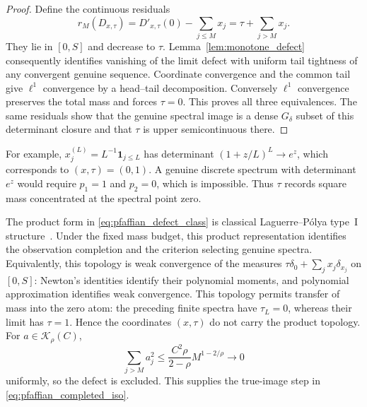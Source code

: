 \documentclass[11pt,a4paper]{amsart}
\numberwithin{equation}{section}
\theoremstyle{definition}
\theoremstyle{remark}
\begin{document}
\begin{proof}
Define the continuous residuals
\begin{equation}\label{eq:spectral_monotone_defect}
 r_M(D_{x,\tau})=D'_{x,\tau}(0)-\sum_{j\le M}x_j
               =\tau+\sum_{j>M}x_j.
\end{equation}
They lie in $[0,S]$ and decrease to $\tau$. Lemma~\ref{lem:monotone_defect} consequently identifies vanishing of the limit defect with uniform tail tightness of any convergent genuine sequence. Coordinate convergence and the common tail give $\ell^1$ convergence by a head--tail decomposition. Conversely $\ell^1$ convergence preserves the total mass and forces $\tau=0$. This proves all three equivalences. The same residuals show that the genuine spectral image is a dense $G_\delta$ subset of this determinant closure and that $\tau$ is upper semicontinuous there.
\end{proof}

For example, $x_j^{(L)}=L^{-1}\mathbf1_{j\le L}$ has determinant
$(1+z/L)^L\to e^z$, which corresponds to $(x,\tau)=(0,1)$. A genuine discrete spectrum with determinant $e^z$ would require $p_1=1$ and $p_2=0$, which is impossible. Thus $\tau$ records square mass concentrated at the spectral point zero.

The product form in \eqref{eq:pfaffian_defect_class} is classical Laguerre--P\'olya type~I structure~\cite{NguyenVishnyakova}. Under the fixed mass budget, this product representation identifies the observation completion and the criterion selecting genuine spectra. Equivalently, this topology is weak convergence of the measures
$\tau\delta_0+\sum_jx_j\delta_{x_j}$ on $[0,S]$: Newton's identities identify their polynomial moments, and polynomial approximation identifies weak convergence. This topology permits transfer of mass into the zero atom: the preceding finite spectra have $\tau_L=0$, whereas their limit has $\tau=1$. Hence the coordinates $(x,\tau)$ do not carry the product topology.
For $a\in\mathcal K_\rho(C)$,
\[
 \sum_{j>M}a_j^2\le\frac{C^2\rho}{2-\rho}M^{1-2/\rho}\longrightarrow0
\]
uniformly, so the defect is excluded. This supplies the true-image step in \eqref{eq:pfaffian_completed_iso}.
\end{document}
